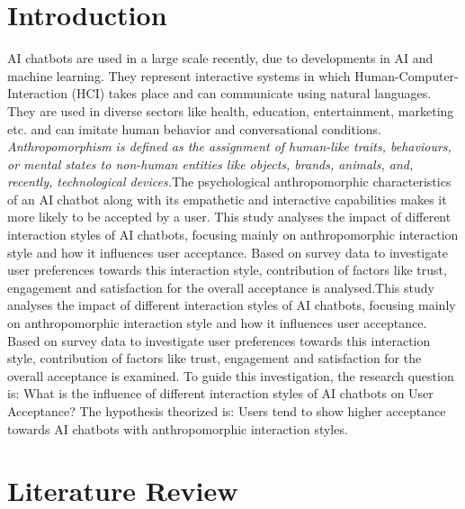 \documentclass[conference]{IEEEtran}
\begin{document}
\section{Introduction}
AI chatbots are used in a large scale recently, due to developments in AI and machine learning. They represent interactive systems in which Human-Computer-Interaction (HCI) takes place and can communicate using natural languages. They are used in diverse sectors like health, education, entertainment, marketing etc. and can imitate human behavior and conversational conditions\cite{b1}.
\textit{Anthropomorphism is defined as the assignment of human-like traits, behaviours, or mental states to non-human entities like objects, brands, animals, and, recently, technological devices.}The psychological anthropomorphic characteristics of an AI chatbot along with its empathetic and interactive capabilities makes it more likely to be accepted by a user\cite{b2}. This study analyses the impact of different interaction styles of AI chatbots, focusing mainly on anthropomorphic interaction style and how it influences user acceptance. Based on survey data to investigate user preferences towards this interaction style, contribution of factors like trust, engagement and satisfaction for the overall acceptance is analysed.This study analyses the impact of different interaction styles of AI chatbots, focusing mainly on anthropomorphic interaction style and how it influences user acceptance. Based on survey data to investigate user preferences towards this interaction style, contribution of factors like trust, engagement and satisfaction for the overall acceptance is examined. To guide this investigation, the research question is: What is the influence of different interaction styles of AI chatbots on User Acceptance? The hypothesis theorized is: Users tend to show higher acceptance towards AI chatbots with anthropomorphic interaction styles.

\section{Literature Review}
\end{document}
